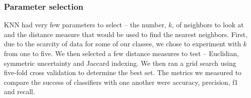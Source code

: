 \documentclass[]{article}   %
\begin{document}
\subsubsection{Parameter selection}
KNN had very few parameters to select – the number, $k$, of neighbors to look at and the distance measure that would be used to find the nearest neighbors. First, due to the scarcity of data for some of our classes, we chose to experiment with $k$ from one to five. We then selected a few distance measures to test – Euclidian, symmetric uncertainty and Jaccard indexing. We then ran a grid search using five-fold cross validation to determine the best set. The metrics we measured to compare the success of classifiers with one another were accuracy, precision, f1 and recall. 



\begin{thebibliography}{9}
\end{thebibliography}
\end{document}
